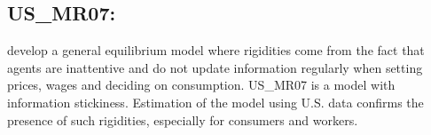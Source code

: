 \documentclass[11pt,a4paper]{article}
\begin{document}
	\subsection{US\_MR07: \cite{MankiwReis2007}}
	\label{USMR07}
	\cite{MankiwReis2007} develop a general equilibrium model where rigidities come from the fact that agents are inattentive and do not update information regularly when setting prices, wages and deciding on consumption. {US\_MR07} is a model with information stickiness. Estimation of the model using U.S. data confirms the presence of such rigidities, especially for consumers and workers.
	
\end{document}
